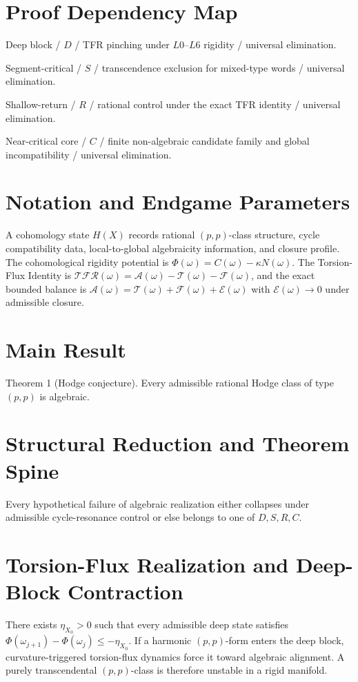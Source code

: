 \documentclass[11pt]{article}
\theoremstyle{definition}
\begin{document}
\section{Proof Dependency Map}
Deep block / $D$ / TFR pinching under $L0$--$L6$ rigidity / universal elimination.

Segment-critical / $S$ / transcendence exclusion for mixed-type words / universal elimination.

Shallow-return / $R$ / rational control under the exact TFR identity / universal elimination.

Near-critical core / $C$ / finite non-algebraic candidate family and global incompatibility / universal elimination.
\section{Notation and Endgame Parameters}
A cohomology state $H(X)$ records rational $(p,p)$-class structure, cycle compatibility data, local-to-global algebraicity information, and closure profile. The cohomological rigidity potential is $\Phi(\omega)=C(\omega)-\kappa N(\omega)$. The Torsion-Flux Identity is $\mathcal{TFR}(\omega)=\mathcal A(\omega)-\mathcal T(\omega)-\mathcal F(\omega)$, and the exact bounded balance is $\mathcal A(\omega)=\mathcal T(\omega)+\mathcal F(\omega)+\mathcal E(\omega)$ with $\mathcal E(\omega)\to 0$ under admissible closure.
\section{Main Result}
Theorem 1 (Hodge conjecture). Every admissible rational Hodge class of type $(p,p)$ is algebraic.
\section{Structural Reduction and Theorem Spine}
Every hypothetical failure of algebraic realization either collapses under admissible cycle-resonance control or else belongs to one of $D,S,R,C$.
\section{Torsion-Flux Realization and Deep-Block Contraction}
There exists $\eta_{X_0}>0$ such that every admissible deep state satisfies $\Phi(\omega_{j+1})-\Phi(\omega_j)\le -\eta_{X_0}$. If a harmonic $(p,p)$-form enters the deep block, curvature-triggered torsion-flux dynamics force it toward algebraic alignment. A purely transcendental $(p,p)$-class is therefore unstable in a rigid manifold.
\end{document}
